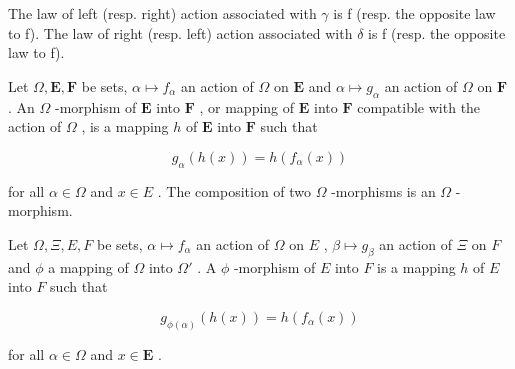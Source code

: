 The law of left (resp. right) action associated with \(\gamma\) is f (resp. the opposite law to f). The law of right (resp. left) action associated with \(\delta\) is f (resp. the opposite law to f).

Let \(\Omega, \mathbf{E}, \mathbf{F}\) be sets, \(\alpha \mapsto f_{\alpha}\) an action of \(\Omega\) on \(\mathbf{E}\) and \(\alpha \mapsto g_{\alpha}\) an action of \(\Omega\) on \(\mathbf{F}\) . An \(\Omega\) -morphism of \(\mathbf{E}\) into \(\mathbf{F}\) , or mapping of \(\mathbf{E}\) into \(\mathbf{F}\) compatible with the action of \(\Omega\) , is a mapping \(h\) of \(\mathbf{E}\) into \(\mathbf{F}\) such that

\[
g _ {\alpha} (h (x)) = h \left(f _ {\alpha} (x)\right)
\]

for all \(\alpha \in \Omega\) and \(x \in E\) . The composition of two \(\Omega\) -morphisms is an \(\Omega\) -morphism.

Let \(\Omega, \Xi, E, F\) be sets, \(\alpha \mapsto f_{\alpha}\) an action of \(\Omega\) on \(E\) , \(\beta \mapsto g_{\beta}\) an action of \(\Xi\) on \(F\) and \(\phi\) a mapping of \(\Omega\) into \(\Omega'\) . A \(\phi\) -morphism of \(E\) into \(F\) is a mapping \(h\) of \(E\) into \(F\) such that

\[
g _ {\phi (\alpha)} (h (x)) = h (f _ {\alpha} (x))
\]

for all \(\alpha \in \Omega\) and \(x \in \mathbf{E}\) .

